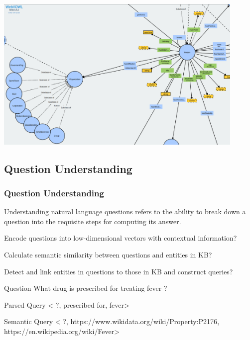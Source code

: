 \documentclass[t]{beamer}
\begin{document}
\begin{frame}[c]
    \includegraphics[width=120mm]{Screenshot from 2023-01-20 06-19-57.png}
\end{frame}

\subsection{Question Understanding}
\begin{frame}
    \frametitle{Question Understanding}
    \begin{itemize}
    \small{\item Understanding natural language questions refers to the ability to break down a question into the requisite steps for computing its answer.
    \item Encode questions into low-dimensional vectors with contextual information?
    \item Calculate semantic similarity between questions and entities in KB?
    \item Detect and link entities in questions to those in KB and construct queries?}
    \end{itemize}
    \begin{block}{Question}
        \scriptsize{{\color{violet} What} drug is {\color{teal} prescribed for} treating {\color{red} fever}{\color{violet} ?}}
    \end{block}
    \begin{block}{Parsed Query}
        \tiny{<{\color{red} ?}, {\color{teal} prescribed for}, {\color{red} fever}>}
    \end{block}
    \begin{block}{Semantic Query}
        \tiny{<{\color{red} ?}, {\color{teal} https://www.wikidata.org/wiki/Property:P2176}, {\color{red} https://en.wikipedia.org/wiki/Fever}>}
    \end{block}
\end{frame}
\end{document}
